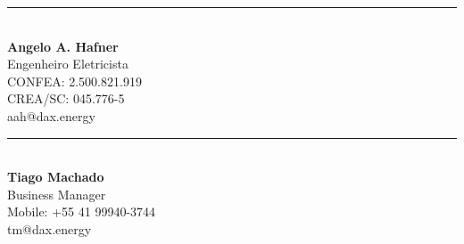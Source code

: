 \documentclass[a4paper]{article}
\begin{document}
\noindent %
\begin{minipage}[t]{0.5\textwidth} %
	\centering %
	\vspace{5cm} %
	\rule{6cm}{0.4pt}\\ %
	\textbf{Angelo A. Hafner}\\ %
	Engenheiro Eletricista\\ %
	CONFEA: 2.500.821.919\\ %
	CREA/SC: 045.776-5\\ %
	aah@dax.energy %
\end{minipage}%
\hfill %
\begin{minipage}[t]{0.5\textwidth} %
	\centering %
	\vspace{5cm} %
	\rule{6cm}{0.4pt}\\ %
	\textbf{Tiago Machado}\\ %
	Business Manager\\ %
	Mobile: +55 41 99940-3744\\ %
	tm@dax.energy %
\end{minipage}
\end{document}
